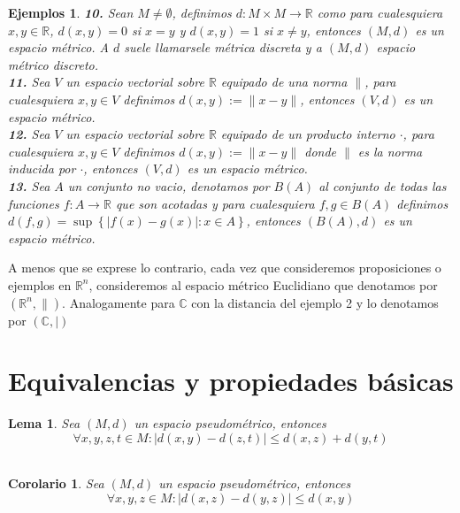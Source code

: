 \documentclass[oneside]{book} %
\theoremstyle{Teorema}
\newtheorem{Corolario}[Definicion]{Corolario}
\newtheorem{Lema}[Definicion]{Lema}
\theoremstyle{Ejemplos}
\newtheorem{Ejemplos}[Definicion]{Ejemplos}
\theoremstyle{[Obs]}
\newcommand{\abs}[1]{\left|#1\right|} %
\newcommand{\absSymbol}{\left|\right.} %
\newcommand{\norm}[1]{\lVert#1\rVert} %
\newcommand{\normSymbol}{\lVert} %
\renewcommand{\{}{\left\lbrace} %
\renewcommand{\}}{\right\rbrace} %
\newcommand{\R}{\mathbb{R}} %
\newcommand{\C}{\mathbb{C}} %
\newcommand{\Rn}{\mathbb{R}^n} %
\begin{document}
\begin{Ejemplos}
				\textbf{10.} Sean $M \neq \emptyset$, definimos $d : M \times M \to \R$ como para cualesquiera $x, y \in \R$, $d(x, y) = 0$ si $x = y$ y $d(x, y) = 1$ si $x \neq y$, entonces $(M, d)$ es un espacio métrico. A $d$ suele llamarsele métrica discreta y a $(M, d)$ espacio métrico discreto. \\

				\textbf{11.} Sea $V$ un espacio vectorial sobre $\R$ equipado de una norma $\normSymbol$, para cualesquiera $x, y \in V$ definimos $d(x, y) := \norm{x - y}$, entonces $(V, d)$ es un espacio métrico. \\

				\textbf{12.} Sea $V$ un espacio vectorial sobre $\R$ equipado de un producto interno $\cdot$, para cualesquiera $x, y \in V$ definimos $d(x, y) := \norm{x - y}$ donde $\normSymbol$ es la norma inducida por $\cdot$, entonces $(V, d)$ es un espacio métrico. \\

				\textbf{13.} Sea $A$ un conjunto no vacio, denotamos por $B(A)$ al conjunto de todas las funciones $f : A \to \R$ que son acotadas y para cualesquiera $f, g \in B(A)$ definimos $d(f, g) = \sup\{ \abs{f(x) - g(x)} : x \in A \}$, entonces $(B(A), d)$ es un espacio métrico. \\

			\end{Ejemplos}

			A menos que se exprese lo contrario, cada vez que consideremos proposiciones o ejemplos en $\Rn$, consideremos al espacio métrico Euclidiano que denotamos por $(\Rn, \normSymbol)$. Analogamente para $\C$ con la distancia del ejemplo 2 y lo denotamos por $(\C, \absSymbol)$ \\

		\section{Equivalencias y propiedades básicas}

			\begin{Lema}
				
				Sea $(M, d)$ un espacio pseudométrico, entonces \\

				\[ \forall x, y, z, t \in M : \abs{d(x, y) - d(z, t)} \leq d(x, z) + d(y, t) \] \\

			\end{Lema}

			\begin{Corolario}

				Sea $(M, d)$ un espacio pseudométrico, entonces \\

				\[ \forall x, y, z \in M : \abs{d(x, z) - d(y, z)} \leq d(x, y) \] \\

			\end{Corolario}
\end{document}

